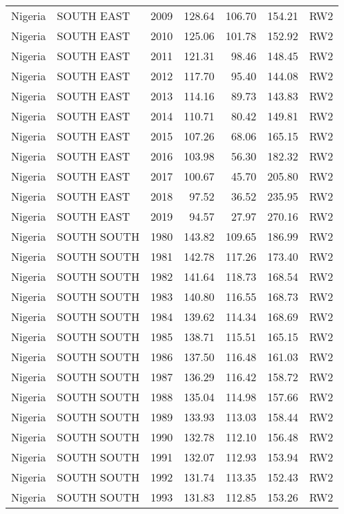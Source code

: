 \begin{longtable}{lllrrrl}
  Nigeria & SOUTH EAST & 2009 & 128.64 & 106.70 & 154.21 & RW2 \\ 
  Nigeria & SOUTH EAST & 2010 & 125.06 & 101.78 & 152.92 & RW2 \\ 
  Nigeria & SOUTH EAST & 2011 & 121.31 & 98.46 & 148.45 & RW2 \\ 
  Nigeria & SOUTH EAST & 2012 & 117.70 & 95.40 & 144.08 & RW2 \\ 
  Nigeria & SOUTH EAST & 2013 & 114.16 & 89.73 & 143.83 & RW2 \\ 
  Nigeria & SOUTH EAST & 2014 & 110.71 & 80.42 & 149.81 & RW2 \\ 
  Nigeria & SOUTH EAST & 2015 & 107.26 & 68.06 & 165.15 & RW2 \\ 
  Nigeria & SOUTH EAST & 2016 & 103.98 & 56.30 & 182.32 & RW2 \\ 
  Nigeria & SOUTH EAST & 2017 & 100.67 & 45.70 & 205.80 & RW2 \\ 
  Nigeria & SOUTH EAST & 2018 & 97.52 & 36.52 & 235.95 & RW2 \\ 
  Nigeria & SOUTH EAST & 2019 & 94.57 & 27.97 & 270.16 & RW2 \\ 
  Nigeria & SOUTH SOUTH & 1980 & 143.82 & 109.65 & 186.99 & RW2 \\ 
  Nigeria & SOUTH SOUTH & 1981 & 142.78 & 117.26 & 173.40 & RW2 \\ 
  Nigeria & SOUTH SOUTH & 1982 & 141.64 & 118.73 & 168.54 & RW2 \\ 
  Nigeria & SOUTH SOUTH & 1983 & 140.80 & 116.55 & 168.73 & RW2 \\ 
  Nigeria & SOUTH SOUTH & 1984 & 139.62 & 114.34 & 168.69 & RW2 \\ 
  Nigeria & SOUTH SOUTH & 1985 & 138.71 & 115.51 & 165.15 & RW2 \\ 
  Nigeria & SOUTH SOUTH & 1986 & 137.50 & 116.48 & 161.03 & RW2 \\ 
  Nigeria & SOUTH SOUTH & 1987 & 136.29 & 116.42 & 158.72 & RW2 \\ 
  Nigeria & SOUTH SOUTH & 1988 & 135.04 & 114.98 & 157.66 & RW2 \\ 
  Nigeria & SOUTH SOUTH & 1989 & 133.93 & 113.03 & 158.44 & RW2 \\ 
  Nigeria & SOUTH SOUTH & 1990 & 132.78 & 112.10 & 156.48 & RW2 \\ 
  Nigeria & SOUTH SOUTH & 1991 & 132.07 & 112.93 & 153.94 & RW2 \\ 
  Nigeria & SOUTH SOUTH & 1992 & 131.74 & 113.35 & 152.43 & RW2 \\ 
  Nigeria & SOUTH SOUTH & 1993 & 131.83 & 112.85 & 153.26 & RW2 \\ 

\end{longtable}
